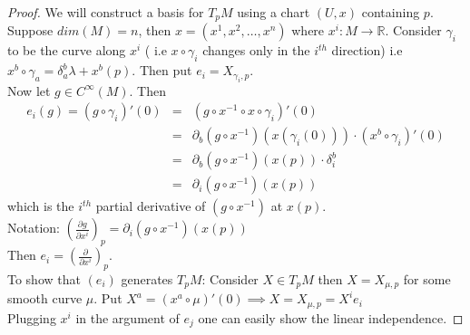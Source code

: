 \documentclass[a4paper]{report}
\theoremstyle{definition}
\theoremstyle{remark}
\begin{document}
		\begin{proof}
			We will construct a basis for $T_pM$ using a chart $(U,x)$ containing $p$.
			Suppose $dim(M)=n$, then $x=(x^1,x^2,\dots,x^n)$ where $x^i:M \to \mathbb{R}$. 
			Consider $\gamma_i$ to be the curve along $x^i$ ( i.e $x\circ\gamma_i$ changes only in the $i^{th}$ direction)
			i.e $ x^{b}\circ\gamma_{a} = \delta^b_a\lambda + x^{b}(p)$.
			Then put $e_i = X_{\gamma_i,p}$.\\
			Now let $g \in C^{\infty}(M)$. Then 
			\begin{eqnarray*}
				e_i(g) = \left(g \circ \gamma_i\right)'(0) &=& \left(g \circ x^{-1} \circ x \circ \gamma_i\right)'(0) \\
				& = & \partial_b\left(g \circ x^{-1} \right)\left(x(\gamma_i(0))\right)\cdot \left(x^b \circ \gamma_i\right)'(0) \\
				&=&  \partial_b\left(g \circ x^{-1} \right)\left(x(p)\right) \cdot \delta_{i}^{b} \\
				&=&  \partial_i\left(g \circ x^{-1} \right)\left(x(p)\right)
			\end{eqnarray*} 
			which is the $i^{th}$ partial derivative of $(g \circ x^{-1})$ at $x(p)$. \\
			Notation: $\left(\tfrac{\partial g}{\partial x^i}\right)_p  = \partial_i\left(g \circ x^{-1} \right)\left(x(p)\right)$ \\
			Then $e_i = \left(\tfrac{\partial}{\partial x^i}\right)_p$. \\
			To show that $(e_i)$ generates $T_pM$: Consider $X \in T_pM$ then $X = X_{\mu,p}$ for some smooth curve $\mu$. Put $X^a = (x^a \circ \mu)'(0) \implies X = X_{\mu,p} = X^ie_i$ \\
			Plugging $x^i$ in the argument of $e_j$ one can easily show the linear independence.	
		\end{proof}
\end{document}
